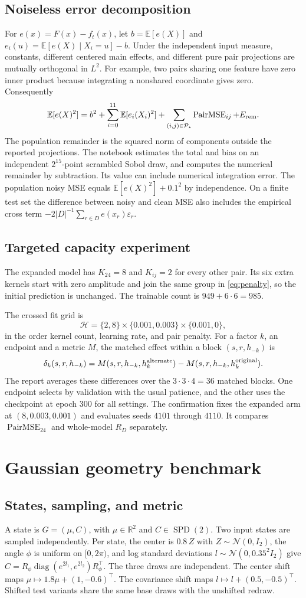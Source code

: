 \documentclass[11pt]{article}
\let\StudyMathSection\section
\let\StudyMathSubsection\subsection
\newcommand{\E}{\mathbb{E}}
\newcommand{\R}{\mathbb{R}}
\newcommand{\N}{\mathcal{N}}
\newcommand{\SPD}{\operatorname{SPD}}
\newcommand{\setP}{\mathcal{P}}
\begin{document}
\StudyMathSubsection{Noiseless error decomposition}

For \(e(x)=F(x)-f_t(x)\), let \(b=\E[e(X)]\) and
\(e_i(u)=\E[e(X)\mid X_i=u]-b\). Under the independent input measure,
constants, different centered main effects, and different pure pair
projections are mutually orthogonal in \(L^2\). For example, two pairs
sharing one feature have zero inner product because integrating a
nonshared coordinate gives zero. Consequently
\[
 \E[e(X)^2]
 =b^2+\sum_{i=0}^{11}\E[e_i(X_i)^2]
    +\sum_{(i,j)\in\setP_\star}\operatorname{PairMSE}_{ij} + E_{\rm rem}.
\]
The population remainder is the squared norm of components outside the
reported projections. The notebook estimates the total and bias on an
independent \(2^{15}\)-point scrambled Sobol draw, and computes the
numerical remainder by subtraction. Its value can include numerical
integration error. The population noisy MSE equals
\(\E[e(X)^2]+0.1^2\) by independence. On a finite test set the difference
between noisy and clean MSE also includes the empirical cross term
\(-2|D|^{-1}\sum_{r\in D}e(x_r)\varepsilon_r\).

\StudyMathSubsection{Targeted capacity experiment}

The expanded model has \(K_{24}=8\) and \(K_{ij}=2\) for every other
pair. Its six extra kernels start with zero amplitude and join the same
group in \eqref{eq:penalty}, so the initial prediction is unchanged.
The trainable count is \(949+6\cdot6=985\).

The crossed fit grid is
\[
 \mathcal H=\{2,8\}\times\{0.001,0.003\}\times\{0.001,0\},
\]
in the order kernel count, learning rate, and pair penalty.
For a factor \(k\), an endpoint and a metric \(M\), the matched effect
within a block \((s,r,h_{-k})\) is
\[
 \delta_k(s,r,h_{-k})
    =M(s,r,h_{-k},h_k^{\rm alternate})
     -M(s,r,h_{-k},h_k^{\rm original}).
\]
The report averages these differences over the \(3\cdot3\cdot4=36\)
matched blocks. One endpoint selects by validation with the usual
patience, and the other uses the checkpoint at epoch \(300\) for all
settings. The confirmation fixes the expanded arm at \((8,0.003,0.001)\)
and evaluates seeds \(4101\) through \(4110\). It compares
\(\operatorname{PairMSE}_{24}\) and whole-model \(R_D\) separately.

\StudyMathSection{Gaussian geometry benchmark}

\StudyMathSubsection{States, sampling, and metric}

A state is \(G=(\mu,C)\), with \(\mu\in\R^2\) and \(C\in\SPD(2)\).
Two input states are sampled independently. Per state, the center is
\(0.8\,Z\) with \(Z\sim\N(0,I_2)\), the angle \(\phi\) is uniform on
\([0,2\pi)\), and log standard deviations \(l\sim\N(0,0.35^2 I_2)\)
give \(C=R_\phi\operatorname{diag}(e^{2l_1},e^{2l_2})R_\phi^\top\).
The three draws are independent. The center shift maps
\(\mu\mapsto 1.8\mu+(1,-0.6)^\top\). The covariance shift maps
\(l\mapsto l+(0.5,-0.5)^\top\). Shifted test variants share the same
base draws with the unshifted redraw.
\end{document}
